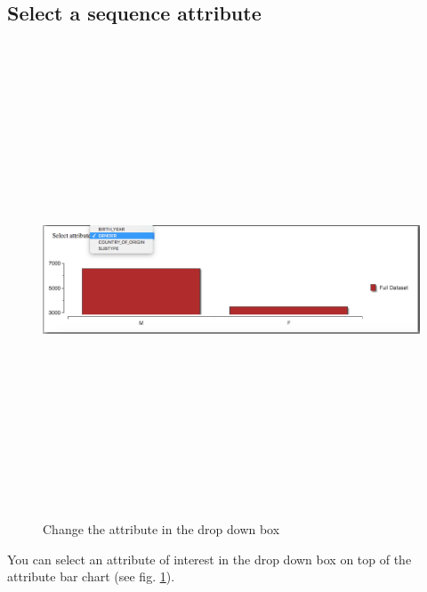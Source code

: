 \documentclass[a4paper, 11pt]{article} %
\begin{document}
\subsection{Select a sequence attribute}
\begin{figure}[H]
\centering
\includegraphics[width=400pt, height=400pt, keepaspectratio=true]{images/change_attr.PNG}
\caption{Change the attribute in the drop down box}
\label{fig:change_attr}
\end{figure}
You can select an attribute of interest in the drop down box on top of the attribute bar chart (see fig. \ref{fig:change_attr}).
\end{document}

